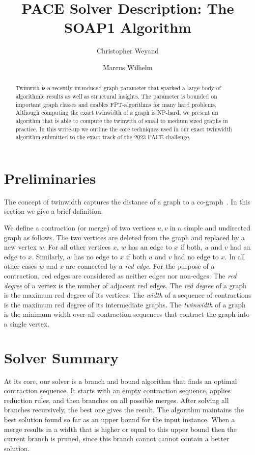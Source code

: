 \documentclass[a4paper,UKenglish,cleveref, autoref, thm-restate]{lipics-v2021}
\title{PACE Solver Description: The SOAP1 Algorithm} %
\author{Christopher Weyand}{Karlsruhe Institute of Technology, Karlsruhe, Germany}{christopher.weyand@kit.edu}{https://orcid.org/0000-0003-0354-6650}{}
\author{Marcus Wilhelm}{Karlsruhe Institute of Technology, Karlsruhe, Germany}{marcus.wilhelm@kit.edu}{https://orcid.org/0000-0002-4507-0622}{}
\begin{document}
\maketitle

\begin{abstract}
Twinwith is a recently introduced graph parameter that sparked a large body of algorithmic results as well as structural insights.
The parameter is bounded on important graph classes and enables FPT-algorithms for many hard problems.
Although computing the exact twinwidth of a graph is NP-hard, we present an algorithm that is able to compute the twinwith of small to medium sized graphs in practice.
In this write-up we outline the core techniques used in our exact twinwidth algorithm submitted to the exact track of the 2023 PACE challenge.
\end{abstract}

\section{Preliminaries}
The concept of twinwidth captures the distance of a graph to a co-graph~\cite{twin1}.
In this section we give a brief definition.

We define a contraction (or merge) of two vertices $u,v$ in a simple and undirected graph as follows.
The two vertices are deleted from the graph and replaced by a new vertex $w$.
For all other vertices $x$, $w$ has an edge to $x$ if both, $u$ and $v$ had an edge to $x$.
Similarly, $w$ has no edge to $x$ if both $u$ and $v$ had no edge to $x$.
In all other cases $w$ and $x$ are connected by a \emph{red edge}.
For the purpose of a contraction, red edges are considered as neither edges nor non-edges.
The \emph{red degree} of a vertex is the number of adjacent red edges.
The \emph{red degree} of a graph is the maximum red degree of its vertices.
The \emph{width} of a sequence of contractions is the maximum red degree of its intermediate graphs.
The \emph{twinwidth} of a graph is the minimum width over all contraction sequences that contract the graph into a single vertex.

\section{Solver Summary}
At its core, our solver is a branch and bound algorithm that finds an optimal contraction sequence.
It starts with an empty contraction sequence, applies reduction rules, and then branches on all possible merges.
After solving all branches recursively, the best one gives the result.
The algorithm maintains the best solution found so far as an upper bound for the input instance.
When a merge results in a width that is higher or equal to this upper bound then the current branch is pruned, since this branch cannot cannot contain a better solution.
\end{document}
